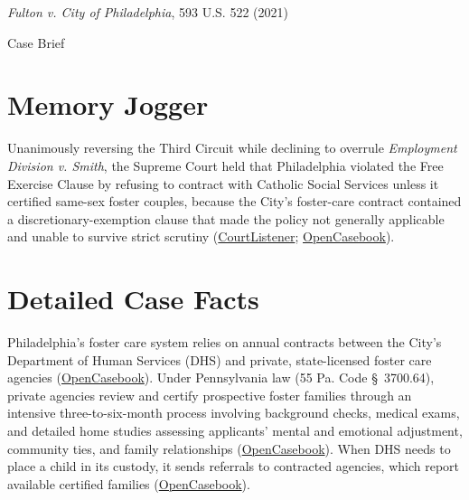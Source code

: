 \documentclass[12pt]{article}
\begin{document}
\begin{center}
{\LARGE \textit{Fulton v. City of Philadelphia}, 593 U.S. 522 (2021)\par}
\vspace{0.8em}
{\large Case Brief\par}
\end{center}
\vspace{1em}

\section{Memory Jogger}
Unanimously reversing the Third Circuit while declining to overrule \textit{Employment Division v. Smith}, the Supreme Court held that Philadelphia violated the Free Exercise Clause by refusing to contract with Catholic Social Services unless it certified same-sex foster couples, because the City's foster-care contract contained a discretionary-exemption clause that made the policy not generally applicable and unable to survive strict scrutiny (\href{https://www.courtlistener.com/opinion/4892570/fulton-v-philadelphia/}{CourtListener}; \href{https://opencasebook.org/casebooks/4501-constitutional-law/resources/12.9-fulton-v-city-of-philadelphia-2020/}{OpenCasebook}).

\section{Detailed Case Facts}
Philadelphia's foster care system relies on annual contracts between the City's Department of Human Services (DHS) and private, state-licensed foster care agencies (\href{https://opencasebook.org/casebooks/4501-constitutional-law/resources/12.9-fulton-v-city-of-philadelphia-2020/}{OpenCasebook}). Under Pennsylvania law (55 Pa. Code \S~3700.64), private agencies review and certify prospective foster families through an intensive three-to-six-month process involving background checks, medical exams, and detailed home studies assessing applicants' mental and emotional adjustment, community ties, and family relationships (\href{https://opencasebook.org/casebooks/4501-constitutional-law/resources/12.9-fulton-v-city-of-philadelphia-2020/}{OpenCasebook}). When DHS needs to place a child in its custody, it sends referrals to contracted agencies, which report available certified families (\href{https://opencasebook.org/casebooks/4501-constitutional-law/resources/12.9-fulton-v-city-of-philadelphia-2020/}{OpenCasebook}).
\end{document}
